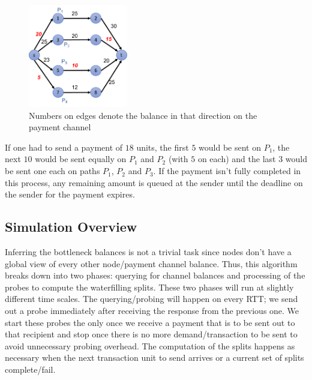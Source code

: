\documentclass[a4paper]{article}
\newcommand{\TU}{transaction unit\xspace}
\begin{document}
\begin{figure}
\includegraphics[height=4.5cm]{sample_graph.pdf}
\caption{Numbers on edges denote the balance in that direction on the payment channel}
\label{fig:sample_graph}
\end{figure}

If one had to send a payment of $18$ units, the first $5$ would be sent on $P_1$, the next $10$ would be sent equally on $P_1$ and $P_2$ (with $5$ on each) and the
last $3$ would be sent one each on paths $P_1$, $P_2$ and $P_3$. If the payment isn't fully completed in this process, any remaining amount is queued at the sender
until the deadline on the sender for the payment expires.

\subsection{Simulation Overview}
Inferring the bottleneck balances is not a trivial task since nodes don't have a global view of every other node/payment channel balance. Thus, this algorithm
breaks down into two phases: querying for channel balances and processing of the probes to compute the waterfilling splits. These two phases will run at slightly
different time scales. The querying/probing will happen on every RTT; we send out a probe immediately after receiving the response from the previous one. 
We start these probes the only once we receive a payment that is to be sent out to that recipient and stop once there is no more demand/transaction to be sent
to avoid unnecessary probing overhead. The computation of the splits happens as necessary when the next \TU to send arrives or a current set of splits complete/fail.
\end{document}
